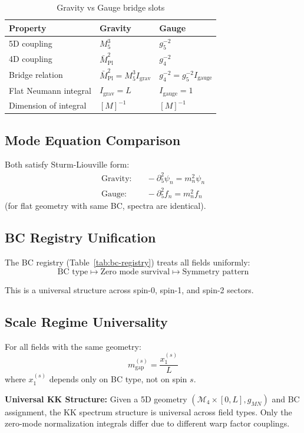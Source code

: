 \documentclass[11pt,a4paper]{article}
\begin{document}
\begin{table}[h]
\centering
\caption{Gravity vs Gauge bridge slots}
\label{tab:bridge-comparison}
\begin{tabular}{lll}
\toprule
Property & Gravity & Gauge \\
\midrule
5D coupling & $M_5^3$ & $g_5^{-2}$ \\
4D coupling & $\bar{M}_{\text{Pl}}^2$ & $g_4^{-2}$ \\
Bridge relation & $\bar{M}_{\text{Pl}}^2 = M_5^3 I_{\text{grav}}$ & $g_4^{-2} = g_5^{-2} I_{\text{gauge}}$ \\
Flat Neumann integral & $I_{\text{grav}} = L$ & $I_{\text{gauge}} = 1$ \\
Dimension of integral & $[M]^{-1}$ & $[M]^{-1}$ \\
\bottomrule
\end{tabular}
\end{table}

\subsection{Mode Equation Comparison}

Both satisfy Sturm-Liouville form:
\begin{align}
  \text{Gravity:} & \quad -\partial_5^2 \psi_n = m_n^2 \psi_n
  \label{eq:mode-gravity} \\
  \text{Gauge:} & \quad -\partial_5^2 f_n = m_n^2 f_n
  \label{eq:mode-gauge-compare}
\end{align}
(for flat geometry with same BC, spectra are identical).

\subsection{BC Registry Unification}

The BC registry (Table~\ref{tab:bc-registry}) treats all fields uniformly:
\begin{equation}
  \text{BC type} \mapsto \text{Zero mode survival} \mapsto \text{Symmetry pattern}
  \label{eq:bc-map}
\end{equation}

This is a universal structure across spin-0, spin-1, and spin-2 sectors.

\subsection{Scale Regime Universality}

For all fields with the same geometry:
\begin{equation}
  m_{\text{gap}}^{(s)} = \frac{x_1^{(s)}}{L}
  \label{eq:gap-universal}
\end{equation}
where $x_1^{(s)}$ depends only on BC type, not on spin $s$.

\begin{resultbox}
\textbf{Universal KK Structure:} Given a 5D geometry $(\mathcal{M}_4 \times [0,L], g_{MN})$
and BC assignment, the KK spectrum structure is universal across field types.
Only the zero-mode normalization integrals differ due to different warp factor
couplings.
\end{resultbox}
\end{document}
